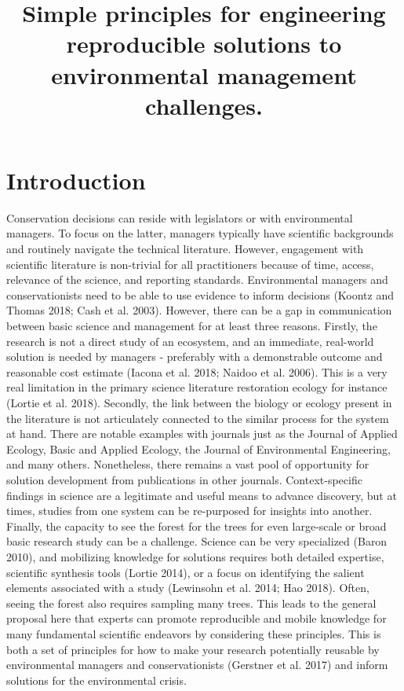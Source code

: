 \documentclass[fleqn,10pt]{wlpeerj} %
\title{Simple principles for engineering reproducible solutions to
environmental management challenges.}
\author[]{}
\begin{document}
\flushbottom
\maketitle
\thispagestyle{empty}

\hypertarget{introduction}{%
\section*{Introduction}\label{introduction}}

Conservation decisions can reside with legislators or with environmental
managers. To focus on the latter, managers typically have scientific
backgrounds and routinely navigate the technical literature. However,
engagement with scientific literature is non-trivial for all
practitioners because of time, access, relevance of the science, and
reporting standards. Environmental managers and conservationists need to
be able to use evidence to inform decisions (Koontz and Thomas 2018;
Cash et al. 2003). However, there can be a gap in communication between
basic science and management for at least three reasons. Firstly, the
research is not a direct study of an ecosystem, and an immediate,
real-world solution is needed by managers - preferably with a
demonstrable outcome and reasonable cost estimate (Iacona et al. 2018;
Naidoo et al. 2006). This is a very real limitation in the primary
science literature restoration ecology for instance (Lortie et al.
2018). Secondly, the link between the biology or ecology present in the
literature is not articulately connected to the similar process for the
system at hand. There are notable examples with journals just as the
Journal of Applied Ecology, Basic and Applied Ecology, the Journal of
Environmental Engineering, and many others. Nonetheless, there remains a
vast pool of opportunity for solution development from publications in
other journals. Context-specific findings in science are a legitimate
and useful means to advance discovery, but at times, studies from one
system can be re-purposed for insights into another. Finally, the
capacity to see the forest for the trees for even large-scale or broad
basic research study can be a challenge. Science can be very specialized
(Baron 2010), and mobilizing knowledge for solutions requires both
detailed expertise, scientific synthesis tools (Lortie 2014), or a focus
on identifying the salient elements associated with a study (Lewinsohn
et al. 2014; Hao 2018). Often, seeing the forest also requires sampling
many trees. This leads to the general proposal here that experts can
promote reproducible and mobile knowledge for many fundamental
scientific endeavors by considering these principles. This is both a set
of principles for how to make your research potentially reusable by
environmental managers and conservationists (Gerstner et al. 2017) and
inform solutions for the environmental crisis.
\end{document}
